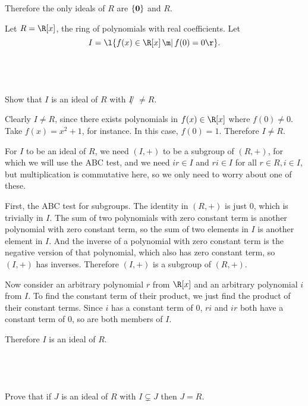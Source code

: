 \documentclass[a4paper]{article}
\begin{document}
Therefore the only ideals of $R$ are $\{ \bf 0 \}$ and $R$.


\begin{questionbody}
Let $R = \R[x]$, the ring of polynomials with real coefficients. Let
\[ I = \l\{ f(x) \in \R[x] \,\m|\, f(0) = 0 \r\}. \]
\end{questionbody}

\subsection{~} %

\begin{questionbody}
Show that $I$ is an ideal of $R$ with $I̸ \ne R$.
\end{questionbody}

Clearly $I \ne R$, since there exists polynomials in $f(x) \in\R[x]$ where $f(0) \ne 0$. Take $f(x) = x^2 + 1$, for instance. In this case, $f(0) = 1$. Therefore $I \ne R$.

For $I$ to be an ideal of $R$, we need $(I, +)$ to be a subgroup of $(R, +)$, for which we will use the ABC test, and we need $ir \in I$ and $ri \in I$ for all $r \in R, i \in I$, but multiplication is commutative here, so we only need to worry about one of these.

First, the ABC test for subgroups. The identity in $(R, +)$ is just $0$, which is trivially in $I$. The sum of two polynomials with zero constant term is another polynomial with zero constant term, so the sum of two elements in $I$ is another element in $I$. And the inverse of a polynomial with zero constant term is the negative version of that polynomial, which also has zero constant term, so $(I, +)$ has inverses. Therefore $(I, +)$ is a subgroup of $(R, +)$.

Now consider an arbitrary polynomial $r$ from $\R[x]$ and an arbitrary polynomial $i$ from $I$. To find the constant term of their product, we just find the product of their constant terms. Since $i$ has a constant term of $0$, $ri$ and $ir$ both have a constant term of $0$, so are both members of $I$.

Therefore $I$ is an ideal of $R$.

\subsection{~} %

\begin{questionbody}
Prove that if $J$ is an ideal of $R$ with $I \subsetneq J$ then $J = R$.
\end{questionbody}
\end{document}
